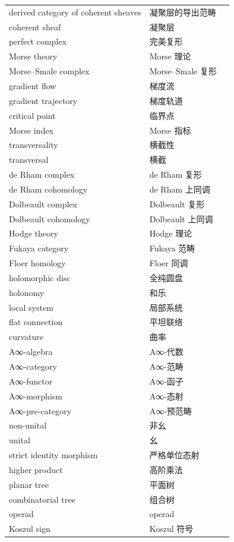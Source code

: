 \begin{longtable}{@{}p{}p{}p{}@{}}
derived category of coherent sheaves & 凝聚层的导出范畴 &  \\
coherent sheaf & 凝聚层 &  \\
perfect complex & 完美复形 &  \\
Morse theory & Morse 理论 &  \\
Morse–Smale complex & Morse–Smale 复形 &  \\
gradient flow & 梯度流 &  \\
gradient trajectory & 梯度轨道 &  \\
critical point & 临界点 &  \\
Morse index & Morse 指标 &  \\
transversality & 横截性 &  \\
transversal & 横截 &  \\
de Rham complex & de Rham 复形 &  \\
de Rham cohomology & de Rham 上同调 &  \\
Dolbeault complex & Dolbeault 复形 &  \\
Dolbeault cohomology & Dolbeault 上同调 &  \\
Hodge theory & Hodge 理论 &  \\
Fukaya category & Fukaya 范畴 &  \\
Floer homology & Floer 同调 &  \\
holomorphic disc & 全纯圆盘 &  \\
holonomy & 和乐 &  \\
local system & 局部系统 &  \\
flat connection & 平坦联络 &  \\
curvature & 曲率 &  \\
A∞-algebra & A∞-代数 &  \\
A∞-category & A∞-范畴 &  \\
A∞-functor & A∞-函子 &  \\
A∞-morphism & A∞-态射 &  \\
A∞-pre-category & A∞-预范畴 &  \\
non-unital & 非幺 &  \\
unital & 幺 &  \\
strict identity morphism & 严格单位态射 &  \\
higher product & 高阶乘法 &  \\
planar tree & 平面树 &  \\
combinatorial tree & 组合树 &  \\
operad & operad &  \\
Koszul sign & Koszul 符号 &  \\

\end{longtable}
